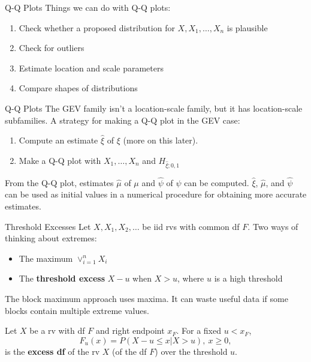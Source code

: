 \documentclass{beamer}
\begin{document}
\begin{frame}{Q-Q Plots}
    Things we can do with Q-Q plots:
    \begin{enumerate}
        \item Check whether a proposed distribution for $X, X_1, \ldots, X_n$ is plausible
        \item Check for outliers
        \item Estimate location and scale parameters
        \item Compare shapes of distributions
    \end{enumerate}
\end{frame}

\begin{frame}{Q-Q Plots}
    The GEV family isn't a location-scale family, but it has location-scale subfamilies. A strategy for making a Q-Q plot in the GEV case:
    \begin{enumerate}
        \item Compute an estimate $\hat{\xi}$ of $\xi$ (more on this later).
        \item Make a Q-Q plot with $X_1, \ldots, X_n$ and $H_{\hat{\xi}; 0, 1}$
    \end{enumerate}
    From the Q-Q plot, estimates $\hat{\mu}$ of $\mu$ and $\hat{\psi}$ of $\psi$ can be computed. $\hat{\xi}$, $\hat{\mu}$, and $\hat{\psi}$ can be used as initial values in a numerical procedure for obtaining more accurate estimates.
\end{frame}

\begin{frame}{Threshold Excesses}
    Let $X, X_1, X_2, \ldots$ be iid rvs with common df $F$. Two ways of thinking about extremes:
    \begin{itemize}
        \item The maximum $\vee_{i = 1}^n X_i$
        \item The \textbf{threshold excess} $X - u$ when $X > u$, where $u$ is a high threshold
    \end{itemize}
    The block maximum approach uses maxima. It can waste useful data if some blocks contain multiple extreme values.

    \begin{definition}
        Let $X$ be a rv with df $F$ and right endpoint $x_F$. For a fixed $u < x_F$,
        \[
        F_u(x) = P(X - u \le x | X > u), \ x \ge 0,
        \]
        is the \textbf{excess df} of the rv $X$ (of the df $F$) over the threshold $u$.
    \end{definition}
\end{frame}
\end{document}

